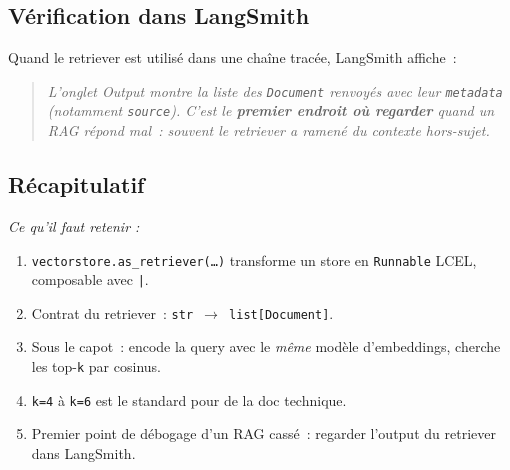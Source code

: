 \documentclass[11pt,a4paper]{article}
\begin{document}
\subsection{Vérification dans LangSmith}

Quand le retriever est utilisé dans une chaîne tracée, LangSmith affiche~:

\begin{center}
\end{center}

\begin{quote}\itshape
L'onglet \emph{Output} montre la liste des \texttt{Document} renvoyés
avec leur \texttt{metadata} (notamment \texttt{source}). C'est le
\textbf{premier endroit où regarder} quand un RAG répond mal~: souvent
le retriever a ramené du contexte hors-sujet.
\end{quote}

\subsection*{Récapitulatif}
{\itshape\sloppy
\textit{Ce qu'il faut retenir :}
\begin{enumerate}[leftmargin=*]
  \item \texttt{vectorstore.as\_retriever(\dots)} transforme un store
        en \texttt{Runnable} LCEL, composable avec \texttt{|}.
  \item Contrat du retriever~: \texttt{str $\to$ list[Document]}.
  \item Sous le capot~: encode la query avec le \emph{même} modèle
        d'embeddings, cherche les top-\texttt{k} par cosinus.
  \item \texttt{k=4} à \texttt{k=6} est le standard pour de la doc
        technique.
  \item Premier point de débogage d'un RAG cassé~: regarder l'output du
        retriever dans LangSmith.
\end{enumerate}
\par}
\end{document}
